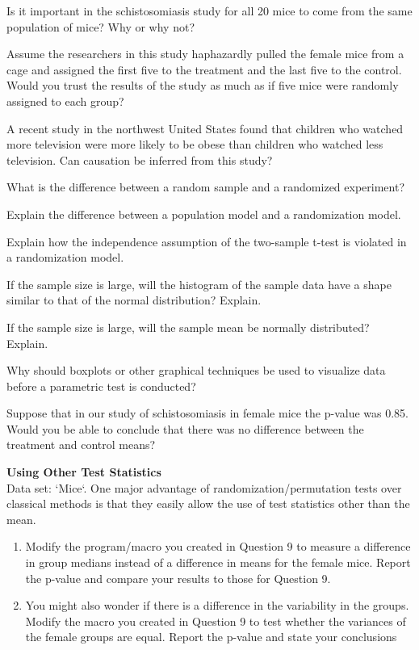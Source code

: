 \documentclass[
]{report}
\begin{document}
\begin{list}{E.}{ \setlength{\itemsep}{0.5em}}
  \item Is it important in the schistosomiasis study for all 20 mice to come from the same population of mice? Why or why not?
  \item Assume the researchers in this study haphazardly pulled the female mice from a cage and assigned the first five to the treatment and the last five to the control. Would you trust the results of the study as much as if five mice were randomly assigned to each group?
  \item A recent study in the northwest United States found that children who watched more television were
more likely to be obese than children who watched less television. Can causation be inferred from
this study?
  \item What is the difference between a random sample and a randomized experiment?
  \item Explain the difference between a population model and a randomization model.
  \item Explain how the independence assumption of the two-sample t-test is violated in a randomization model.
  \item If the sample size is large, will the histogram of the sample data have a shape similar to that of the normal distribution? Explain.
  \item If the sample size is large, will the sample mean be normally distributed? Explain.
  \item Why should boxplots or other graphical techniques be used to visualize data before a parametric test
is conducted?
  \item Suppose that in our study of schistosomiasis in female mice the p-value was 0.85. Would you be able to conclude that there was no difference between the treatment and control means?
  \item \textbf{Using Other Test Statistics} \\
  Data set: `Mice`. One major advantage of randomization/permutation tests over classical methods is that they easily allow the use of test statistics other than the mean.
  \begin{enumerate}
    \setcounter{enumi}{0}  
    \item Modify the program/macro you created in Question 9 to measure a difference in group medians instead of a difference in means for the female mice. Report the p-value and compare your results to those for Question 9.
    \item You might also wonder if there is a difference in the variability in the groups. Modify the macro
you created in Question 9 to test whether the variances of the female groups are equal. Report the
p-value and state your conclusions
  \end{enumerate}
  

\end{list}
\end{document}

